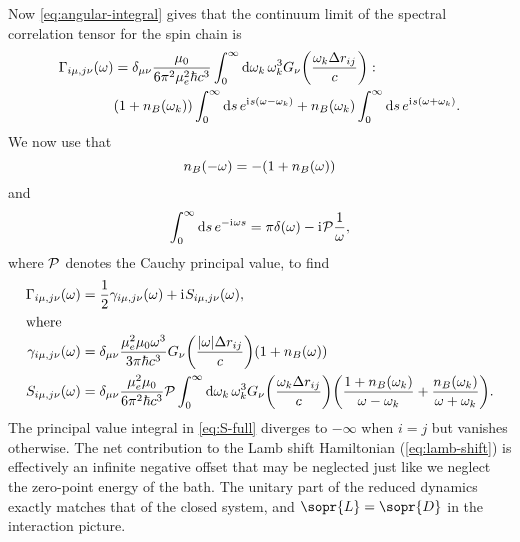 \documentclass[../thesis.tex]{subfiles}
\begin{document}
Now \cref{eq:angular-integral} gives that the continuum limit of the spectral
correlation tensor for the spin chain is
\begin{align}
  \begin{split}
  \Gamma_{i\mu,j\nu}(\omega)
  &= \delta_{\mu\nu} \frac{\mu_0}{6\pi^2 \mu_e^2 \hbar c^3}
  \int_0^\infty \dd{\omega_k} \omega_k^3
  G_{\nu}\qty(\frac{\omega_k \Delta r_{ij}}{c})
  :
  \\
  &\qty(1 + n_B(\omega_k)) \int_0^\infty \dd{s} e^{\mathrm{i}\mkern1mu s(\omega - \omega_k)}
  + n_B(\omega_k) \int_0^\infty \dd{s} e^{\mathrm{i}\mkern1mu s(\omega + \omega_k)}.
  \end{split}
\end{align}
We now use that
\begin{equation}
  n_B(-\omega)
  = -\qty(1 + n_B(\omega))
\end{equation}
and 
\begin{equation}
  \int_0^\infty \dd{s} e^{-\im\omega s}
  = \pi\delta(\omega) - \im\pv\frac{1}{\omega},
\end{equation}
where $\pv$ denotes the Cauchy principal value, to find
\begin{align}
  \Gamma_{i\mu,j\nu}(\omega)
  &= \frac{1}{2}\gamma_{i\mu,j\nu}(\omega) + \im S_{i\mu,j\nu}(\omega),
  \\
  \shortintertext{where}
  \gamma_{i\mu,j\nu}(\omega)
  &= \delta_{\mu\nu} \frac{\mu_e^2\mu_0 \omega^3}{3\pi \hbar c^3}
  G_{\nu}\qty(\frac{\abs{\omega} \Delta r_{ij}}{c})
  (1 + n_B(\omega))
  \label{eq:gamma-full}
  \\
  S_{i\mu,j\nu}(\omega)
  &= \delta_{\mu\nu} \frac{\mu_e^2\mu_0}{6\pi^2 \hbar c^3}
  \pv\int_0^\infty \dd{\omega_k} \omega_k^3
  G_{\nu}\qty(\frac{\omega_k \Delta r_{ij}}{c})
  \qty(\frac{1 + n_B(\omega_k)}{\omega - \omega_k}
  + \frac{n_B(\omega_k)}{\omega + \omega_k}).
  \label{eq:S-full}
\end{align}
The principal value integral in \cref{eq:S-full} diverges to $-\infty$ when $i =
j$ but vanishes otherwise. The net contribution to the Lamb shift Hamiltonian
(\cref{eq:lamb-shift}) is effectively an infinite negative offset that may be
neglected just like we neglect the zero-point energy of the bath. The unitary
part of the reduced dynamics exactly matches that of the closed system, and
$\sopr{L} = \sopr{D}$ in the interaction picture.
\end{document}
